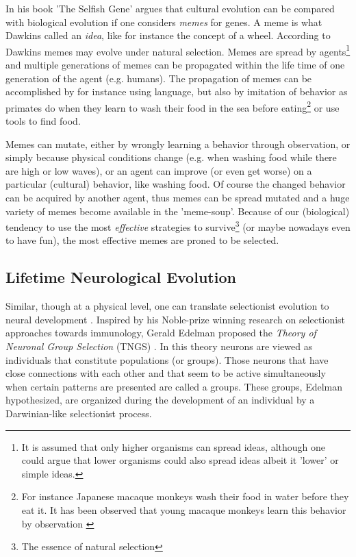 In his book 'The Selfish Gene' \cite{dawkins:1976} argues that cultural evolution can be compared with biological evolution if one considers {\em memes} for genes. A meme is what Dawkins called an {\em idea}, like for instance the concept of a wheel. According to Dawkins memes may evolve under natural selection. Memes are spread by agents\footnote{It is assumed that only higher organisms can spread ideas, although one could argue that lower organisms could also spread ideas albeit it 'lower' or simple ideas.} and multiple generations of memes can be propagated within the life time of one generation of the agent (e.g. humans). The propagation of memes can be accomplished by for instance using language, but also by imitation of behavior as primates do when they learn to wash their food in the sea before eating\footnote{For instance Japanese macaque monkeys wash their food in water before they eat it. It has been observed that young macaque monkeys learn this behavior by observation \cite{byrne:1995}} or use tools to find food.

Memes can mutate, either by wrongly learning a behavior through observation, or simply because physical conditions change (e.g. when washing food while there are high or low waves), or an agent can improve (or even get worse) on a particular (cultural) behavior, like washing food. Of course the changed behavior can be acquired by another agent, thus memes can be spread mutated and a huge variety of memes become available in the 'meme-soup'. Because of our (biological) tendency to use the most {\em effective} strategies to survive\footnote{The essence of natural selection} (or maybe nowadays even to have fun), the most effective memes are proned to be selected.

\subsection{Lifetime Neurological Evolution}\label{s:theory:tngs}

Similar, though at a physical level, one can translate selectionist evolution to neural development \cite{edelman:1987,changeux:1984}. Inspired by his Noble-prize winning research on selectionist approaches towards immunology, Gerald Edelman proposed the {\em Theory of Neuronal Group Selection} (TNGS) \cite{edelman:1987}. In this theory neurons are viewed as individuals that constitute populations (or groups). Those neurons that have close connections with each other and that seem to be active simultaneously when certain patterns are presented are called a groups. These groups, Edelman hypothesized, are organized during the development of an individual by a Darwinian-like selectionist process.

